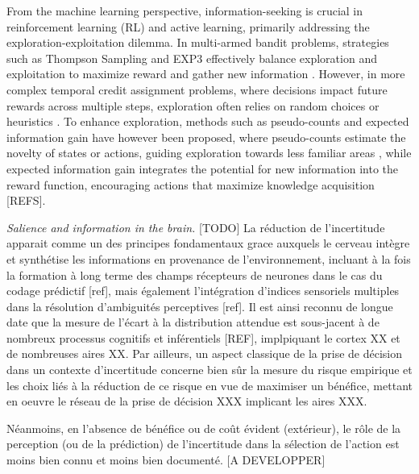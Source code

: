 \documentclass[10pt,letterpaper]{article}
\begin{document}
From the machine learning perspective, information-seeking is crucial in reinforcement learning (RL) and active learning, primarily addressing the exploration-exploitation dilemma. In multi-armed bandit problems, strategies such as Thompson Sampling and EXP3 effectively balance exploration and exploitation to maximize reward and gather new information \cite{robbins1952some, sutton1988learning, thompson1933likelihood, chapelle2011empirical, auer2002finite}. However, in more complex temporal credit assignment problems, where decisions impact future rewards across multiple steps, exploration often relies on random choices or heuristics \cite{sutton1998introduction}. To enhance exploration, methods such as pseudo-counts and expected information gain have however been proposed, where pseudo-counts estimate the novelty of states or actions, guiding exploration towards less familiar areas \cite{bellemare2016unifying}, while expected information gain integrates the potential for new information into the reward function, encouraging actions that maximize knowledge acquisition [REFS].

{\color{blue}
\emph{Salience and information in the brain.}
[TODO]
La réduction de l'incertitude apparait comme un des principes fondamentaux grace auxquels le cerveau intègre et synthétise les informations en provenance de l'environnement, incluant à la fois la formation à long terme des champs récepteurs de neurones dans le cas du codage prédictif [ref], mais également l'intégration d'indices sensoriels multiples dans la résolution d'ambiguités perceptives [ref]. %
Il est ainsi reconnu de longue date que la mesure de l'écart à la distribution attendue est sous-jacent à de nombreux processus cognitifs et inférentiels [REF], implpiquant le cortex XX et de nombreuses aires XX.
Par ailleurs, un aspect classique de la prise de décision dans un contexte d'incertitude concerne bien sûr la mesure du risque empirique et les choix liés à la réduction de ce risque en vue de maximiser un bénéfice, mettant en oeuvre le réseau de la prise de décision XXX implicant les aires XXX.

Néanmoins, en l'absence de bénéfice ou de coût évident (extérieur), %
le rôle de la perception (ou de la prédiction) de l'incertitude dans la sélection de l'action est moins bien connu et moins bien documenté. [A DEVELOPPER]}
\end{document}
